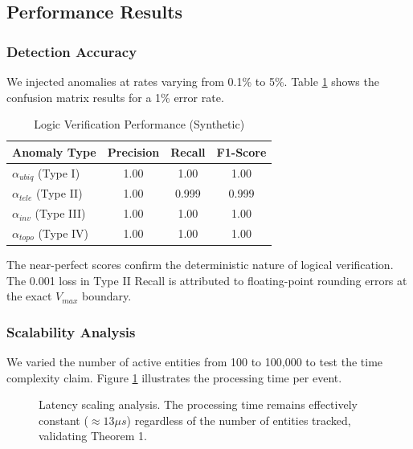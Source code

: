 \documentclass[conference]{IEEEtran}
\begin{document}
\subsection{Performance Results}

\subsubsection{Detection Accuracy}
We injected anomalies at rates varying from 0.1\% to 5\%. Table \ref{tab:results} shows the confusion matrix results for a 1\% error rate.

\begin{table}[htbp]
\caption{Logic Verification Performance (Synthetic)}
\begin{center}
\begin{tabular}{lccc}
\toprule
\textbf{Anomaly Type} & \textbf{Precision} & \textbf{Recall} & \textbf{F1-Score} \\
\midrule
$\alpha_{ubiq}$ (Type I) & 1.00 & 1.00 & 1.00 \\
$\alpha_{tele}$ (Type II) & 1.00 & 0.999 & 0.999 \\
$\alpha_{inv}$ (Type III) & 1.00 & 1.00 & 1.00 \\
$\alpha_{topo}$ (Type IV) & 1.00 & 1.00 & 1.00 \\
\bottomrule
\end{tabular}
\end{center}
\label{tab:results}
\end{table}

The near-perfect scores confirm the deterministic nature of logical verification. The 0.001 loss in Type II Recall is attributed to floating-point rounding errors at the exact $V_{max}$ boundary.

\subsubsection{Scalability Analysis}
We varied the number of active entities from 100 to 100,000 to test the time complexity claim. Figure \ref{fig:scaling} illustrates the processing time per event.

\begin{figure}[htbp]
\centering
{}
\caption{Latency scaling analysis. The processing time remains effectively constant ($\approx 13 \mu s$) regardless of the number of entities tracked, validating Theorem 1.}
\label{fig:scaling}
\end{figure}
\end{document}
